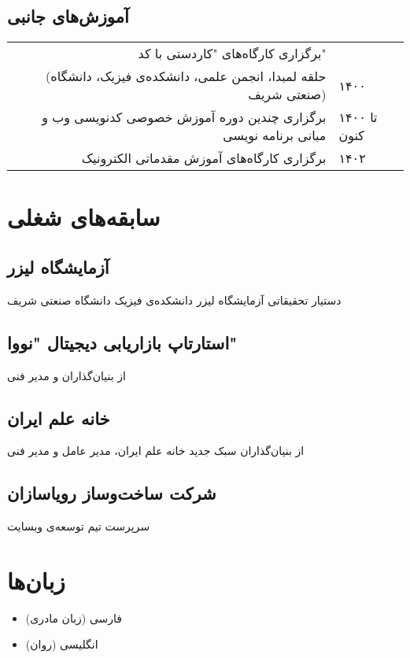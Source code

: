 \documentclass{persian-resume}
\begin{document}
\subsection*{
    آموزش‌های جانبی
}

\begin{tabular*}{\textwidth}{@{\extracolsep{\fill}} rl}
برگزاری کارگاه‌های "کاردستی با کد"\\ (حلقه لمبدا، انجمن علمی، دانشکده‌ی فیزیک‌، دانشگاه صنعتی شریف) & ۱۴۰۰\\
برگزاری چندین دوره آموزش خصوصی کدنویسی وب و مبانی برنامه نویسی & ۱۴۰۰ تا کنون\\
برگزاری کارگاه‌های آموزش مقدماتی الکترونیک & ۱۴۰۲
\end{tabular*}

\section{
    سابقه‌های شغلی
}
\subsection*{
آزمایشگاه لیزر
}
دستیار تحقیقاتی آزمایشگاه لیزر دانشکده‌ی فیزیک دانشگاه صنعتی شریف

\subsection*{
استارتاپ بازاریابی دیجیتال "نووا"
}
از بنیان‌گذاران و مدیر فنی

\subsection*{
خانه علم ایران
}
از بنیان‌گذاران سبک جدید خانه علم ایران، مدیر عامل و مدیر فنی

\subsection*{
شرکت ساخت‌وساز رویاسازان
}
سرپرست تیم توسعه‌ی وبسایت

\section{زبان‌ها}
\begin{itemize}
  \item فارسی (زبان مادری)
  \item انگلیسی (روان)
\end{itemize}
\end{document}
